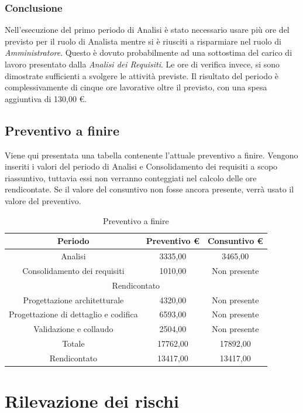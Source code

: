 \documentclass[./PianodiProgetto.tex]{subfiles}
\begin{document}
\subsection{Conclusione}
Nell'esecuzione del primo periodo di Analisi è stato necessario usare più
ore del previsto per il ruolo di Analista mentre si è riusciti a risparmiare nel ruolo di \textit{Amministratore}. Questo è dovuto
probabilmente ad una sottostima del carico di lavoro presentato dalla \textit{Analisi
dei Requisiti}. Le ore di verifica invece, si sono dimostrate sufficienti a svolgere
le attività previste. Il risultato del periodo è complessivamente di cinque ore
lavorative oltre il previsto, con una spesa aggiuntiva di 130,00 \euro{}.
\section{Preventivo a finire}
Viene qui presentata una tabella contenente l'attuale preventivo a finire.
Vengono inseriti i valori del periodo di Analisi e Consolidamento dei requisiti
a scopo riassuntivo, tuttavia essi non verranno conteggiati nel calcolo delle
ore rendicontate. Se il valore del consuntivo non fosse ancora presente, verrà
usato il valore del preventivo.

\begin{table}[H]
	\centering
	\begin{tabular}{|c|c|c|}
		\hline
		Periodo&Preventivo \euro{}&Consuntivo \euro{} \\ \hline
		Analisi&3335,00&3465,00  \\ \hline
		Consolidamento dei requisiti&1010,00&Non presente  \\ \hline
		\multicolumn{3}{|c|}{Rendicontato}  \\ \hline
		Progettazione architetturale&4320,00&Non presente  \\ \hline
		Progettazione di dettaglio e codifica&6593,00&Non presente  \\ \hline
		Validazione e collaudo&2504,00&Non presente  \\ \hline
		Totale&17762,00&17892,00 \\ \hline
		Rendicontato&13417,00&13417,00 \\ \hline
	\end{tabular}
	\caption{Preventivo a finire}
\end{table}

\appendix


\appendix

\chapter{Rilevazione dei rischi}
\end{document}
